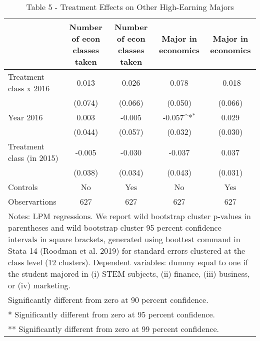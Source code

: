 \begin{table}[]
\caption{Table 5 - Treatment Effects on Other High-Earning Majors}
{
\def\sym#1{\ifmmode^{#1}\else\(^{#1}\)\fi}
\begin{tabular}{@{\extracolsep{2pt}}l*{4}{c}@{}}
\hline\hline


 & Number of econ classes taken & Number of econ classes taken & Major in economics & Major in economics \\
\hline
Treatment class x 2016 & 0.013 & 0.026 & 0.078 & -0.018 \\
 & (0.074) & (0.066) & (0.050) & (0.066) \\
Year 2016 & 0.003 & -0.005 & -0.057\sym{*} & 0.029 \\
 & (0.044) & (0.057) & (0.032) & (0.030) \\
Treatment class (in 2015) & -0.005 & -0.030 & -0.037 & 0.037 \\
 & (0.038) & (0.034) & (0.043) & (0.031) \\
Controls & No & Yes & No & Yes \\

\hline
Observartions & 627 & 627 & 627 & 627 \\
\hline\hline
\multicolumn{5}{l}{\footnotesize Notes: LPM regressions. We report wild bootstrap cluster p-values in parentheses and wild bootstrap cluster 95 percent                confidence intervals in square brackets, generated using boottest command in Stata 14 (Roodman et al. 2019)                for standard errors clustered at the class level (12 clusters). Dependent variables: dummy equal to one if the student                majored in (i) STEM subjects, (ii) finance, (iii) business, or (iv) marketing.}\vspace{-.25em} \\
\multicolumn{5}{l}{\footnotesize * Significantly different from zero at 90 percent confidence.}\vspace{-.25em} \\
\multicolumn{5}{l}{\footnotesize ** Significantly different from zero at 95 percent confidence.}\vspace{-.25em} \\
\multicolumn{5}{l}{\footnotesize *** Significantly different from zero at 99 percent confidence.}
\end{tabular}
}
\end{table}